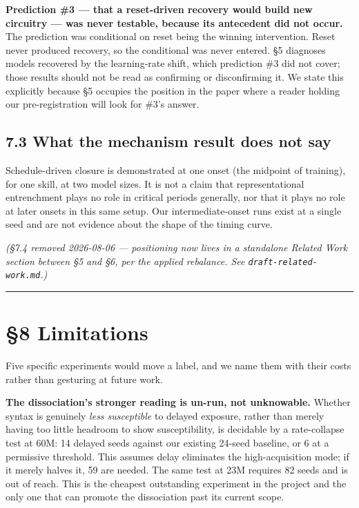 \documentclass{article}
\begin{document}
\textbf{Prediction \#3 --- that a reset-driven recovery would build new circuitry --- was never
testable, because its antecedent did not occur.} The prediction was conditional on reset
being the winning intervention. Reset never produced recovery, so the conditional was never
entered. §5 diagnoses models recovered by the learning-rate shift, which prediction \#3 did
not cover; those results should not be read as confirming or disconfirming it. We state this
explicitly because §5 occupies the position in the paper where a reader holding our
pre-registration will look for \#3's answer.

\subsection{7.3 What the mechanism result does not say}\label{what-the-mechanism-result-does-not-say}

Schedule-driven closure is demonstrated at one onset (the midpoint of training), for one
skill, at two model sizes. It is not a claim that representational entrenchment plays no role
in critical periods generally, nor that it plays no role at later onsets in this same setup.
Our intermediate-onset runs exist at a single seed and are not evidence about the shape of
the timing curve.

\emph{(§7.4 removed 2026-08-06 --- positioning now lives in a standalone Related Work section
between §5 and §6, per the applied rebalance. See \texttt{draft-related-work.md}.)}

\begin{center}\rule{0.5\linewidth}{0.5pt}\end{center}

\section{§8 Limitations}\label{limitations}

Five specific experiments would move a label, and we name them with their costs rather than
gesturing at future work.

\textbf{The dissociation's stronger reading is un-run, not unknowable.} Whether syntax is
genuinely \emph{less susceptible} to delayed exposure, rather than merely having too little
headroom to show susceptibility, is decidable by a rate-collapse test at 60M: 14 delayed
seeds against our existing 24-seed baseline, or 6 at a permissive threshold. This assumes
delay eliminates the high-acquisition mode; if it merely halves it, 59 are needed. The same
test at 23M requires 82 seeds and is out of reach. This is the cheapest outstanding
experiment in the project and the only one that can promote the dissociation past its
current scope.
\end{document}
